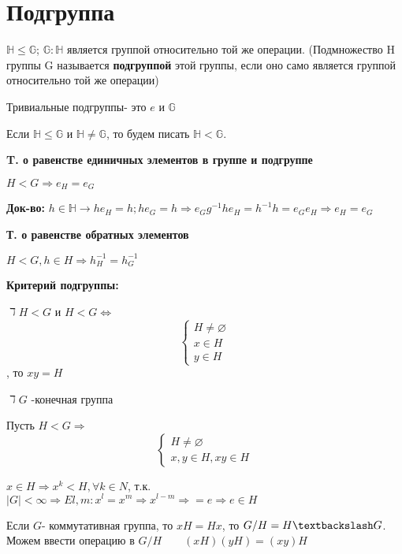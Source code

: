 \documentclass[12pt]{article}
\begin{document}
		\newpage
		\section{Подгруппа}
		
		$\mathds{H} \le \mathds{G}$;
		$\mathds{G}:\mathds{H}$ является группой относительно той же операции. (Подмножество H группы G называется \hypertarget{indef_subgroup}{\textbf{подгруппой}} этой группы, если оно само является группой относительно той же операции)
		
		Тривиальные подгруппы- это $e$ и $\mathds{G}$
		
		Если $\mathds{H}\le \mathds{G}$ и $\mathds{H} \not= \mathds{G}$, то будем писать $\mathds{H}<\mathds{G}$.
		
		\hypertarget{th:subgrop_e}{\textbf{T. о равенстве единичных элементов в группе и подгруппе}} $H<G \Rightarrow e_H=e_G$
		
		\textbf{Док-во:} $h \in \mathds{H} \rightarrow he_H=h ; he_G=h \Rightarrow  e_Gg^{-1}he_H=h^{-1}h=e_Ge_H \Rightarrow e_H=e_G $
		
		\hypertarget{th:subgroup_-1}{\textbf{Т. о равенстве обратных элементов}} $H<G, h \in H \Rightarrow h_H^{-1}=h_G^{-1}$
		
		\hypertarget{th_subgroup_cri}{\textbf{Критерий подгруппы:}} $ \daleth  H<G$ и $H<G \Leftrightarrow $ 
		\begin{equation*}
		\begin{cases}
		H \not= \varnothing 
		\\
		x \in H
		\\
		y \in H
		\end{cases}
		\end{equation*} , то $xy=H$ 
		
		$\daleth G$ -конечная группа 
		
		Пусть $H<G  \Rightarrow$ 
		\begin{equation*}
		\begin{cases}
		H \not= \varnothing  
		\\
		x,y \in H, xy \in H
		\end{cases}
		\end{equation*}
		
		$x\in H \Rightarrow x^k <H, \forall k \in N$, т.к. $|G|<\infty\Rightarrow E l,m : x^l=x^m\Rightarrow x^{l-m}\Rightarrow =e \Rightarrow e \in H$
		
		
		Если $G$- коммутативная группа, то $xH=Hx$, то $G/H=H\textbackslash G$. Можем ввести операцию в $G/H \qquad (xH)(yH)=(xy)H$
		
\end{document}
